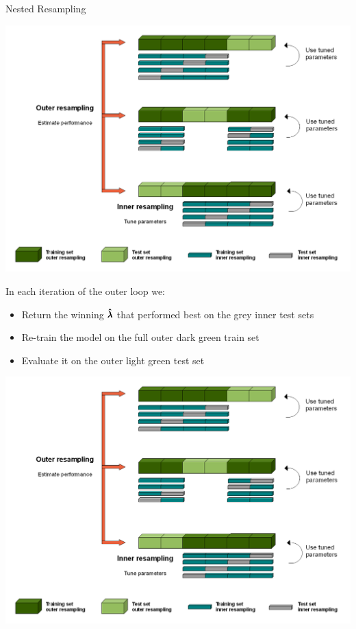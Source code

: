 \begin{frame}[c,allowframebreaks]{Nested Resampling}
    \begin{center}
        \includegraphics[height=0.55\textheight]{Nested_Resampling.png}
    \end{center}

    \framebreak

    \begin{footnotesize}
    In each iteration of the outer loop we:
    \begin{itemize}
    \item Return the winning $\pmb{\hat{\lambda}}$ that performed best on the grey inner test sets
    \item Re-train the model on the full outer dark green train set
    \item Evaluate it on the outer light green test set
    \end{itemize}
    \end{footnotesize}

    \begin{center}
        \includegraphics[height=0.55\textheight]{Nested_Resampling.png}
    \end{center}


\end{frame}
